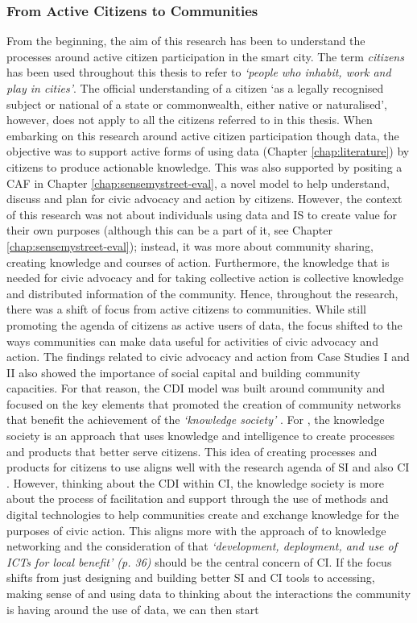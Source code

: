 \subsubsection{From Active Citizens to Communities}
From the beginning, the aim of this research has been to understand the processes around active citizen participation in the smart city. The term \textit{citizens} has been used throughout this thesis to refer to \textit{`people who inhabit, work and play in cities'}. The official understanding of a citizen `as a legally recognised subject or national of a state or commonwealth, either native or naturalised', however, does not apply to all the citizens referred to in this thesis. When embarking on this research around active citizen participation though data, the objective was to support active forms of using data (Chapter \ref{chap:literature}) by citizens to produce actionable knowledge. This was also supported by positing a CAF in Chapter \ref{chap:sensemystreet-eval}, a novel model to help understand, discuss and plan for civic advocacy and action by citizens. However, the context of this research was not about individuals using data and IS to create value for their own purposes (although this can be a part of it, see Chapter \ref{chap:sensemystreet-eval}); instead, it was more about community sharing, creating knowledge and courses of action. Furthermore, the knowledge that is needed for civic advocacy and for taking collective action is collective knowledge and distributed information of the community. Hence, throughout the research, there was a shift of focus from active citizens to communities. While still promoting the agenda of citizens as active users of data, the focus shifted to the ways communities can make data useful for activities of civic advocacy and action. The findings related to civic advocacy and action from Case Studies I and II also showed the importance of social capital and building community capacities. For that reason, the CDI model was built around community and focused on the key elements that promoted the creation of community networks that benefit the achievement of the \textit{`knowledge society'} \citep{jennex_big_2017,hakken_social_2003}. For \citet{jennex_big_2017}, the knowledge society is an approach that uses knowledge and intelligence to create processes and products that better serve citizens. This idea of creating processes and products for citizens to use aligns well with the research agenda of SI and also CI \citep{stillman_community_2009}. However, thinking about the CDI within CI, the knowledge society is more about the process of facilitation and support through the use of methods and digital technologies to help communities create and exchange knowledge for the purposes of civic action. This aligns more with the approach of \citet{hakken_social_2003} to knowledge networking and the consideration of \citet{gurstein_toward_2012} that \textit{`development, deployment, and use of ICTs for local benefit' (p. 36)} should be the central concern of CI. If the focus shifts from just designing and building better SI and CI tools to accessing, making sense of and using data to thinking about the interactions the community is having around the use of data, we can then start 